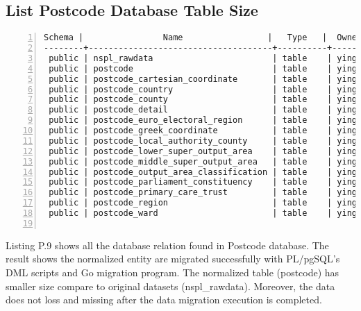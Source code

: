 \subsection{List Postcode Database Table Size}
\lstset{basicstyle=\ttfamily\tiny}  
\begin{lstlisting}[breaklines, frame=single, numbers=left, caption={List size of Postcode normalized table.}, label=commandline-02]
 Schema |                Name                 |   Type   |  Owner  |    Size    | Line Counts 
--------+-------------------------------------+----------+---------+------------+-------------
 public | nspl_rawdata                        | table    | yinghua | 1403 MB    | 1754882   <- same counts 
 public | postcode                            | table    | yinghua | 152 MB     | 1754882   <- same counts 
 public | postcode_cartesian_coordinate       | table    | yinghua | 70 MB      | 1662088
 public | postcode_country                    | table    | yinghua | 8192 bytes | 7
 public | postcode_county                     | table    | yinghua | 8192 bytes | 34
 public | postcode_detail                     | table    | yinghua | 225 MB     | 1754882
 public | postcode_euro_electoral_region      | table    | yinghua | 8192 bytes | 15
 public | postcode_greek_coordinate           | table    | yinghua | 70 MB      | 1664728
 public | postcode_local_authority_county     | table    | yinghua | 48 kB      | 394
 public | postcode_lower_super_output_area    | table    | yinghua | 2560 kB    | 42460
 public | postcode_middle_super_output_area   | table    | yinghua | 528 kB     | 8484
 public | postcode_output_area_classification | table    | yinghua | 8192 bytes | 77
 public | postcode_parliament_constituency    | table    | yinghua | 64 kB      | 653
 public | postcode_primary_care_trust         | table    | yinghua | 40 kB      | 200
 public | postcode_region                     | table    | yinghua | 8192 bytes | 15
 public | postcode_ward                       | table    | yinghua | 544 kB     | 9115


\end{lstlisting}

Listing P.9 shows all the database relation found in Postcode database. The result shows the normalized entity are migrated successfully with PL/pgSQL's DML scripts and Go migration program. The normalized table (postcode) has smaller size compare to original datasets (nspl\_rawdata). Moreover, the data does not loss and missing after the data migration execution is completed. 


